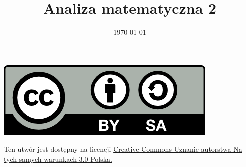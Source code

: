 \documentclass[12pt,a4paper]{article}
\theoremstyle{definition}
\begin{document}
\title{ Analiza matematyczna 2}
\author{\vspace{-5ex}}
\date{\today}
\maketitle
\tableofcontents

\begin{center}
\leavevmode

\includegraphics[width=1 in]{../img/by-sa.png}
\end{center}
\label{fig:cc}
\scriptsize{Ten utwór jest dostępny na licencji  \href{http://creativecommons.org/licenses/by-sa/3.0/pl/}{Creative Commons Uznanie autorstwa-Na tych samych warunkach 3.0 Polska.}}


\pagebreak
\end{document}
